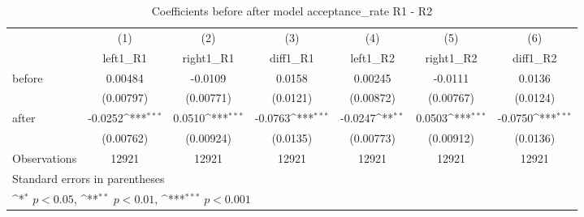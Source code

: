 \begin{table}[!ht]\centering \footnotesize
\def\sym#1{\ifmmode^{#1}\else\(^{#1}\)\fi}
\caption{Coefficients before after model acceptance\_rate R1 - R2}
\begin{tabular}{l*{6}{c}}
\hline\hline
                    &\multicolumn{1}{c}{(1)}&\multicolumn{1}{c}{(2)}&\multicolumn{1}{c}{(3)}&\multicolumn{1}{c}{(4)}&\multicolumn{1}{c}{(5)}&\multicolumn{1}{c}{(6)}\\
                    &\multicolumn{1}{c}{left1\_R1}&\multicolumn{1}{c}{right1\_R1}&\multicolumn{1}{c}{diff1\_R1}&\multicolumn{1}{c}{left1\_R2}&\multicolumn{1}{c}{right1\_R2}&\multicolumn{1}{c}{diff1\_R2}\\
\hline
before              &     0.00484         &     -0.0109         &      0.0158         &     0.00245         &     -0.0111         &      0.0136         \\
                    &   (0.00797)         &   (0.00771)         &    (0.0121)         &   (0.00872)         &   (0.00767)         &    (0.0124)         \\
[1em]
after               &     -0.0252\sym{***}&      0.0510\sym{***}&     -0.0763\sym{***}&     -0.0247\sym{**} &      0.0503\sym{***}&     -0.0750\sym{***}\\
                    &   (0.00762)         &   (0.00924)         &    (0.0135)         &   (0.00773)         &   (0.00912)         &    (0.0136)         \\
\hline
Observations        &       12921         &       12921         &       12921         &       12921         &       12921         &       12921         \\
\hline\hline
\multicolumn{7}{l}{\footnotesize Standard errors in parentheses}\\
\multicolumn{7}{l}{\footnotesize \sym{*} \(p<0.05\), \sym{**} \(p<0.01\), \sym{***} \(p<0.001\)}\\
\end{tabular}
\end{table}
